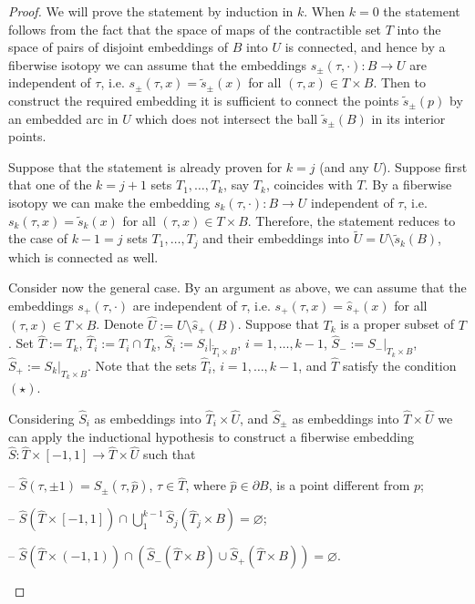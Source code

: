 \documentclass[12pt]{paper}
\theoremstyle{plain}
\theoremstyle{definition}
\newcommand{\wt}{\widetilde}
\newcommand{\wh}{\widehat}
\newcommand{\p}{\partial}
\numberwithin{figure}{section}
\begin{document}
    \begin{proof}
   
    
  
    
     We will  prove the statement by induction in $k$.
     When $k=0$ the statement follows from the fact that  the space of  maps of the contractible set $T$ into the space of pairs of  disjoint embeddings 
     of $B$ into $U$ is connected, and hence by a fiberwise isotopy we can assume that the embeddings $s_\pm(\tau,\cdot):B\to U$ are independent of $\tau$, i.e. $s_\pm(\tau,x)=\wt s_\pm(x)$ for all $(\tau,x)\in T\times B$.
     Then to construct the required embedding it is sufficient to connect the points $\wt s_\pm(p)$ by an embedded arc in $U$ which does not intersect the ball $\wt s_\pm(B)$ in its interior points.
       
    Suppose that  the statement is already proven for    $k=j$ (and any $U$). Suppose first that  one of the  $k=j+1$ sets $T_1,\dots, T_k$, say $T_k$, coincides with $T$. 
    By a fiberwise isotopy we can make the embedding  $s_k(\tau,\cdot):B\to U$ independent of $\tau$, i.e. $s_k(\tau,x)=\wt s_k(x)$ for all $(\tau,x)\in T\times B$. Therefore, the statement reduces to the case of $k-1=j$ sets
    $T_1,\dots, T_j$ and their embeddings into $\wt U=U\setminus\wt s_k(B)$, which is connected as well.
    
   Consider now    the general case. By an argument as above, we can assume that the embeddings $s_+(\tau, \cdot)$ are independent of $\tau$,
   i.e. $s_+(\tau,x)=\wh s_+(x)$ for all $(\tau,x)\in T\times B$. Denote $\wh U:= U\setminus \wh s_+(B)$.
    Suppose that $T_k$ is a proper subset of $T$.  
    Set $\wh T:= T_k$, $\wh T_i:= T_i\cap T_k$,   $\wh S_i:= S_i|_{\wt T_i\times B}$, $i=1,\dots, k-1$, $\wh S_-:= S_-|_{T_k\times B}$, $\wh S_+:= S_k|_{T_k\times B}$. Note that the sets $\wh T_i$, $i=1,\dots, k-1$, and $\wh T$ satisfy the condition $(\star)$.
    
    Considering $\wh S_i$ as embeddings into $\wh T_i\times\wh U$, and $\wh S_\pm$ as embeddings into $\wh T\times\wh U$ we can apply the inductional hypothesis to construct a fiberwise embedding 
    $\wh S:\wh T\times [-1,1]\to \wh T\times\wh U$ such that
    \begin{description}
       \item{--}  $\wh S(\tau,\pm 1)=S_\pm(\tau,\wh p)$, $\tau\in \wh T$, where $\wh p\in \p B$, is a point different from $p$;
      \item{--} $\wh S (\wh T\times[-1,1])\cap\bigcup\limits_1^{k-1}\wh S_j(\wh T_j\times B)=\varnothing$;
      \item{--} $\wh S (\wh T\times(-1,1))\cap\left(\wh S_-(\wh T\times B)\cup \wh S_+(\wh T\times B)\right)=\varnothing$.
\end{description}


\end{proof}
\end{document}
